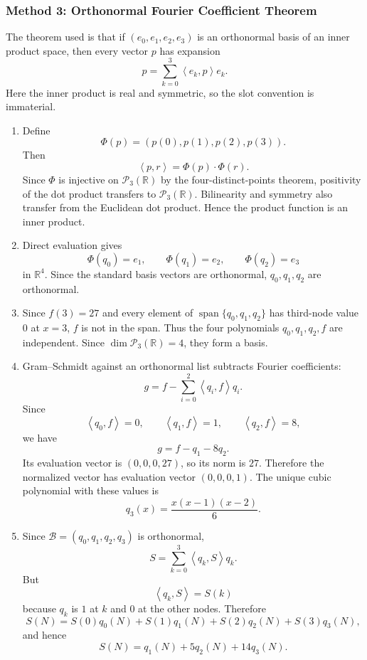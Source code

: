 \documentclass[12pt]{article}
\newcommand{\R}{\mathbb{R}}
\newcommand{\B}{\mathcal{B}}
\newcommand{\Ppoly}{\mathcal{P}}
\newcommand{\Span}{\operatorname{span}}
\newcommand{\ip}[2]{\left\langle #1,#2\right\rangle}
\begin{document}
\newpage
\subsubsection{Method 3: Orthonormal Fourier Coefficient Theorem}
The theorem used is that if $(e_0,e_1,e_2,e_3)$ is an orthonormal basis of an inner product space, then every vector $p$ has expansion
\[
p=\sum_{k=0}^{3}\ip{e_k}{p}e_k.
\]
Here the inner product is real and symmetric, so the slot convention is immaterial.

\begin{enumerate}[label=(\alph*)]
  \item Define
  \[
  \Phi(p)=(p(0),p(1),p(2),p(3)).
  \]
  Then
  \[
  \ip{p}{r}=\Phi(p)\cdot\Phi(r).
  \]
  Since $\Phi$ is injective on $\Ppoly_3(\R)$ by the four-distinct-points theorem, positivity of the dot product transfers to $\Ppoly_3(\R)$. Bilinearity and symmetry also transfer from the Euclidean dot product. Hence the product function is an inner product.

  \item Direct evaluation gives
  \[
  \Phi(q_0)=e_1,
  \qquad
  \Phi(q_1)=e_2,
  \qquad
  \Phi(q_2)=e_3
  \]
  in $\R^4$. Since the standard basis vectors are orthonormal, $q_0,q_1,q_2$ are orthonormal.

  \item Since $f(3)=27$ and every element of $\Span\{q_0,q_1,q_2\}$ has third-node value $0$ at $x=3$, $f$ is not in the span. Thus the four polynomials $q_0,q_1,q_2,f$ are independent. Since $\dim\Ppoly_3(\R)=4$, they form a basis.

  \item Gram--Schmidt against an orthonormal list subtracts Fourier coefficients:
  \[
  g=f-\sum_{i=0}^{2}\ip{q_i}{f}q_i.
  \]
  Since
  \[
  \ip{q_0}{f}=0,
  \qquad
  \ip{q_1}{f}=1,
  \qquad
  \ip{q_2}{f}=8,
  \]
  we have
  \[
  g=f-q_1-8q_2.
  \]
  Its evaluation vector is $(0,0,0,27)$, so its norm is $27$. Therefore the normalized vector has evaluation vector $(0,0,0,1)$. The unique cubic polynomial with these values is
  \[
  q_3(x)=\frac{x(x-1)(x-2)}6.
  \]

  \item Since $\B=(q_0,q_1,q_2,q_3)$ is orthonormal,
  \[
  S=\sum_{k=0}^{3}\ip{q_k}{S}q_k.
  \]
  But
  \[
  \ip{q_k}{S}=S(k)
  \]
  because $q_k$ is $1$ at $k$ and $0$ at the other nodes. Therefore
  \[
  S(N)=S(0)q_0(N)+S(1)q_1(N)+S(2)q_2(N)+S(3)q_3(N),
  \]
  and hence
  \[
  \boxed{S(N)=q_1(N)+5q_2(N)+14q_3(N).}
  \]
\end{enumerate}
\end{document}
